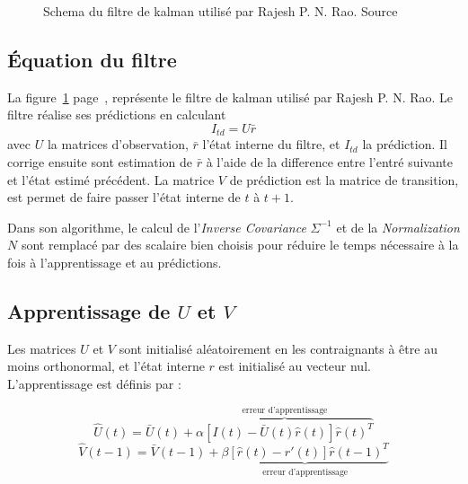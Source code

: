 \begin{figure}[ht]
   \begin{center}
   \end{center}
   \caption[Schema du filtre de kalman]{Schema du filtre de kalman utilisé par
   Rajesh P. N. Rao. Source \cite{Rao1999}}
   \label{fig:filtre_kalman}
\end{figure}

\subsection{Équation du filtre} %
\label{sub:Équation du filtre}

La figure~\ref{fig:filtre_kalman} page~\pageref{fig:filtre_kalman}, représente
le filtre de kalman utilisé par Rajesh P. N. Rao. Le filtre réalise ses
prédictions en calculant
\[ I_{td} = U\bar{r} \]
avec $U$ la matrices d'observation, $\bar{r}$ l'état interne du filtre, et
$I_{td}$ la prédiction. Il corrige ensuite sont estimation de $\bar{r}$ à
l'aide de la difference entre l'entré suivante et l'état estimé précédent. La
matrice $V$ de prédiction est la matrice de transition, est permet de faire
passer l'état interne de $t$ à $t+1$.

Dans son algorithme, le calcul de l'\textit{Inverse Covariance} $\Sigma^{-1}$ et
de la \textit{Normalization} $N$ sont remplacé par des scalaire bien choisis
pour réduire le temps nécessaire à la fois à l'apprentissage et au prédictions.


\subsection{Apprentissage de $U$ et $V$} %
\label{sub:Apprentissage de U et V}

Les matrices $U$ et $V$ sont initialisé aléatoirement en les contraignants
à être au moins orthonormal, et l'état interne $r$ est initialisé au vecteur
nul. L'apprentissage est définis par :

\begin{equation}
   \label{eqn:learning_U}
   \hat{U}(t) = \bar{U}(t) + \overbrace{\alpha[I(t) - \bar{U}(t)\hat{r}(t)]\hat{r}(t)^T}^\text{erreur d'apprentissage}
\end{equation}
\begin{equation}
   \label{eqn:learning_V}
   \hat{V}(t-1) = \bar{V}(t-1) + \underbrace{\beta[\hat{r}(t) - r'(t)]\hat{r}(t-1)^T}_\text{erreur d'apprentissage}
\end{equation}

